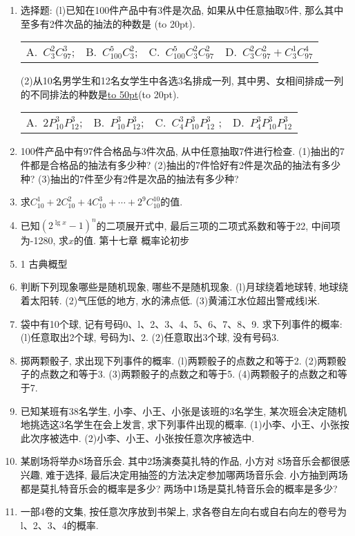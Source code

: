 \documentclass[10pt,a4paper]{article}
\newcommand{\blank}[1]{\underline{\hbox to #1pt{}}}
\newcommand{\bracket}[1]{(\hbox to #1pt{})}
\newcommand{\fourch}[4]{\par\begin{tabular}{p{.23\textwidth}p{.23\textwidth}p{.23\textwidth}p{.23\textwidth}}
A.~#1 &B.~#2& C.~#3& D.~#4
\end{tabular}}
\begin{document}
\begin{enumerate}[1.]
(1)关于$x$的方程$C_{34}^{x^2-2x}=C_{34}^{5x-6}$的解集是\blank{50}.
(2)6个人排成一列, 其中甲乙两人之间至少有两个人的不同排法种数是\blank{50}.
(3)由数字1、2、3、4组成没有重复数字的不同自然数的个数是\blank{50}.
(4)若$m\in \{2,5,7,8\}$, $n\{1,3,4,6\}$, 则方程$\dfrac{x^2}m+\dfrac{y^2}n=1$表示焦点在$x$轴上的椭圆有\blank{50}个.
(5)若$(1+\sqrt x)^n$的展开式的系数和大于$8$且小于$32$, 则系数最大的项是\blank{50}.
\item 选择题:
(l)已知在100件产品中有3件是次品, 如果从中任意抽取5件, 那么其中至多有2件次品的抽法的种数是 \bracket{20}.
\fourch{$C_3^2C_{97}^3$;}{$C_{100}^5C_3^2$;}{$C_{100}^5C_3^2C_{97}^2$}{$C_3^2C_{97}^2+C_3^1C_{97}^4$}
(2)从10名男学生和12名女学生中各选3名排成一列, 其中男、女相间排成一列的不同排法的种数是\blank{50}\bracket{20}.
\fourch{$2P_{10}^3P_{12}^3$;}{$P_{10}^3P_{12}^3$;}{$C_4^3P_{10}^3P_{12}^3$ ;}{$P_4^3P_{10}^3P_{12}^3$}
\item 100件产品中有97件合格品与3件次品, 从中任意抽取7件进行检查.
(1)抽出的7件都是合格品的抽法有多少种?
(2)抽出的7件恰好有2件是次品的抽法有多少种?
(3)抽出的7件至少有2件是次品的抽法有多少种?
\item 求$C_{10}^1+2C_{10}^2+4C_{10}^3+\cdots +2^9C_{10}^{10}$的值.
\item 已知$(2^{\lg x}-1)^n$的二项展开式中, 最后三项的二项式系数和等于22, 中间项为-1280, 求$x$的值.
第十七章  概率论初步
\item 1  古典概型
\item 判断下列现象哪些是随机现象, 哪些不是随机现象.
(l)月球绕着地球转, 地球绕着太阳转.
(2)气压低的地方, 水的沸点低.
(3)黄浦江水位超出警戒线l米.
\item 袋中有10个球, 记有号码0、l、2、3、4、5、6、7、8、9. 求下列事件的概率:
(l)任意取出2个球, 号码为l、2.
(2)任意取出3个球, 没有号码3.
\item 掷两颗骰子, 求出现下列事件的概率.
(l)两颗骰子的点数之和等于2.
(2)两颗骰子的点数之和等于3.
(3)两颗骰子的点数之和等于5.
(4)两颗骰子的点数之和等于7.
\item 已知某班有38名学生, 小李、小王、小张是该班的3名学生, 某次班会决定随机地挑选这3名学生在会上发言, 求下列事件出现的概率.
(1)小李、小王、小张按此次序被选中.
(2)小李、小王、小张按任意次序被选中.
\item 某剧场将举办8场音乐会. 其中2场演奏莫扎特的作品, 小方对 8场音乐会都很感兴趣, 难于选择, 最后决定用抽签的方法决定参加哪两场音乐会. 小方抽到两场都是莫扎特音乐会的概率是多少? 两场中1场是莫扎特音乐会的概率是多少?
\item 一部4卷的文集, 按任意次序放到书架上, 求各卷自左向右或自右向左的卷号为l、2、3、4的概率.

\end{enumerate}
\end{document}
